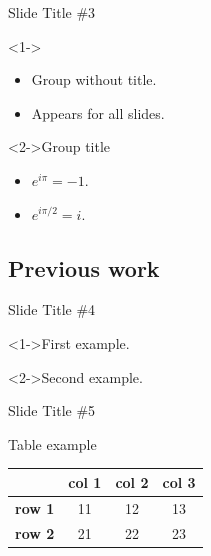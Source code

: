 \documentclass{beamer}
\begin{document}
\begin{frame}{Slide Title \#3}
	\begin{block}
		<1->{}
		\begin{itemize}
			\item Group without title.
			\item Appears for all slides.
		\end{itemize}
	\end{block}
	\begin{exampleblock}
		<2->{Group title}
		\begin{itemize}
			\item $e^{i\pi}=-1$.
			\item $e^{i\pi/2}=i$.
		\end{itemize}
	\end{exampleblock}
\end{frame}

\subsection{Previous work}

\begin{frame}{Slide Title \#4}
	\begin{example}
		<1->First example. 
	\end{example}
	\begin{example}
		<2->Second example.
	\end{example}
\end{frame}

\begin{frame}{Slide Title \#5}
	\begin{center}
		Table example \\[12pt]
		\begin{tabular}{c||c|c|c|}
			& \textbf{col 1} & \textbf{col  2} & \textbf{col 3} \\
			\hline
			\hline
			\textbf{row 1} & 11 & 12 & 13 \\
			\hline
			\textbf{row 2} & 21 & 22 & 23 \\
		\end{tabular}
    \end{center}
\end{frame}
\end{document}
